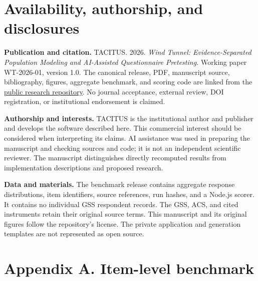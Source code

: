 \documentclass[
  11pt,
]{article}
\let\originalsection\section
\renewcommand{\section}{\Needspace{5\baselineskip}\originalsection}
\begin{document}
\section{Availability, authorship, and
disclosures}\label{availability-authorship-and-disclosures}

\textbf{Publication and citation.} TACITUS. 2026. \emph{Wind Tunnel:
Evidence-Separated Population Modeling and AI-Assisted Questionnaire
Pretesting.} Working paper WT-2026-01, version 1.0. The canonical
release, PDF, manuscript source, bibliography, figures, aggregate
benchmark, and scoring code are linked from the
\href{https://github.com/sargonxg/TACITUS-Knowledge-Pipeline-open/tree/main/research/wind-tunnel-methodology/v1}{public
research repository}. No journal acceptance, external review, DOI
registration, or institutional endorsement is claimed.

\textbf{Authorship and interests.} TACITUS is the institutional author
and publisher and develops the software described here. This commercial
interest should be considered when interpreting its claims. AI
assistance was used in preparing the manuscript and checking sources and
code; it is not an independent scientific reviewer. The manuscript
distinguishes directly recomputed results from implementation
descriptions and proposed research.

\textbf{Data and materials.} The benchmark release contains aggregate
response distributions, item identifiers, source references, run hashes,
and a Node.js scorer. It contains no individual GSS respondent records.
The GSS, ACS, and cited instruments retain their original source terms.
This manuscript and its original figures follow the repository's
license. The private application and generation templates are not
represented as open source.

\section*{Appendix A. Item-level
benchmark}\label{appendix-a.-item-level-benchmark}
\end{document}
